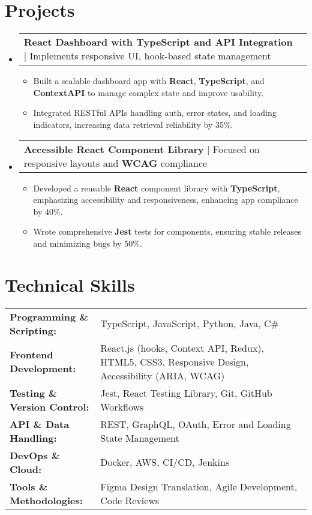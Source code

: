 \documentclass[letterpaper,11pt]{article}
\makeatletter
\newcommand{\resumeItem}[1]{
  \item\footnotesize{
    {#1 \vspace{-2pt}}
  }
}
\newcommand{\resumeProjectHeading}[2]{
    \item
    \begin{tabular*}{1.001\textwidth}{l@{\extracolsep{\fill}}r}
      \small#1 & \textbf{\small #2}\\
    \end{tabular*}\vspace{-7pt}
}
\newcommand{\resumeSubHeadingListStart}{\begin{itemize}[leftmargin=0pt, label={}]}
\newcommand{\resumeSubHeadingListEnd}{\end{itemize}}
\newcommand{\resumeItemListStart}{\begin{itemize}[leftmargin=*]}
\newcommand{\resumeItemListEnd}{\end{itemize}\vspace{-5pt}}
\makeatother
\begin{document}
\section{Projects}
    \vspace{-5pt}
    \resumeSubHeadingListStart
      \resumeProjectHeading
          {\textbf{React Dashboard with TypeScript and API Integration} | Implements responsive UI, hook-based state management}{}
          \resumeItemListStart
              \resumeItem{Built a scalable dashboard app with \textbf{React}, \textbf{TypeScript}, and \textbf{ContextAPI} to manage complex state and improve usability.}
              \resumeItem{Integrated RESTful APIs handling auth, error states, and loading indicators, increasing data retrieval reliability by 35\%.}
          \resumeItemListEnd
          \vspace{-16pt}
      \resumeProjectHeading
          {\textbf{Accessible React Component Library} | Focused on responsive layouts and \textbf{WCAG} compliance}{}
          \resumeItemListStart
              \resumeItem{Developed a reusable \textbf{React} component library with \textbf{TypeScript}, emphasizing accessibility and responsiveness, enhancing app compliance by 40\%.}
              \resumeItem{Wrote comprehensive \textbf{Jest} tests for components, ensuring stable releases and minimizing bugs by 50\%.}
          \resumeItemListEnd
          \vspace{-16pt}  
    \resumeSubHeadingListEnd
\vspace{-10pt}
\section{Technical Skills}
        \vspace{-14pt}
        \begin{table}[h]
            \footnotesize
            \begin{tabular}{p{0.3\linewidth} p{0.7\linewidth}}
                \textbf{Programming \& Scripting:} & TypeScript, JavaScript, Python, Java, C\# \\
                \textbf{Frontend Development:} & React.js (hooks, Context API, Redux), HTML5, CSS3, Responsive Design, Accessibility (ARIA, WCAG) \\
                \textbf{Testing \& Version Control:} & Jest, React Testing Library, Git, GitHub Workflows \\
                \textbf{API \& Data Handling:} & REST, GraphQL, OAuth, Error and Loading State Management \\
                \textbf{DevOps \& Cloud:} & Docker, AWS, CI/CD, Jenkins \\
                \textbf{Tools \& Methodologies:} & Figma Design Translation, Agile Development, Code Reviews \\
            \end{tabular}
        \end{table}
\end{document}
